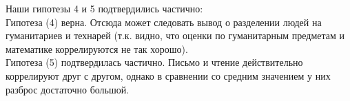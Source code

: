 \documentclass[12pt,a4paper]{article}
\begin{document}
Наши гипотезы 4 и 5 подтвердились частично:\\
Гипотеза (4) верна. Отсюда может следовать вывод о разделении людей на гуманитариев и технарей (т.к. видно, что оценки по гуманитарным предметам и математике коррелируются не так хорошо).\\
Гипотеза (5) подтвердилась частично. Письмо и чтение действительно коррелируют друг с другом, однако в сравнении со средним значением у них разброс достаточно большой.
\end{document}
